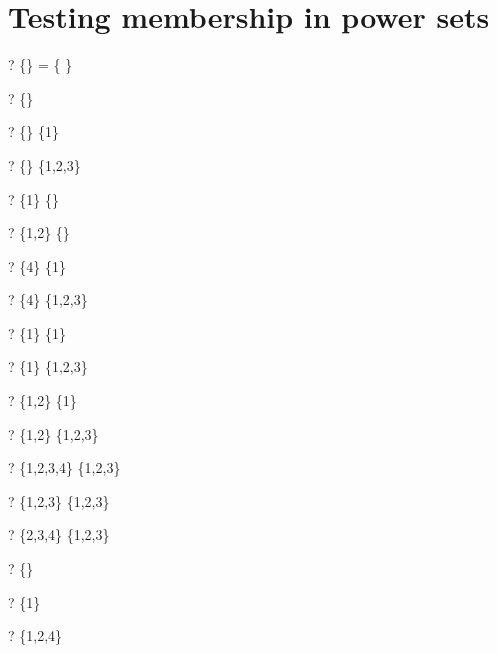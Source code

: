 \documentclass{article}
\begin{document}
\section{Testing membership in power sets}
\begin{zed} \vdash?  \power \{\} = \{ \emptyset[\nat] \} \end{zed}
\begin{zed} \vdash?  \emptyset[\power\nat] \in \power \{\} \end{zed}
\begin{zed} \vdash?  \{\} \in \power \{1\} \end{zed}
\begin{zed} \vdash?  \{\} \in \power \{1,2,3\} \end{zed}
\begin{zed} \vdash?  \{1\} \notin \power \{\} \end{zed}
\begin{zed} \vdash?  \{1,2\} \notin \power \{\} \end{zed}
\begin{zed} \vdash?  \{4\} \notin \power \{1\} \end{zed}
\begin{zed} \vdash?  \{4\} \notin \power \{1,2,3\} \end{zed}
\begin{zed} \vdash?  \{1\} \in \power \{1\} \end{zed}
\begin{zed} \vdash?  \{1\} \in \power \{1,2,3\} \end{zed}
\begin{zed} \vdash?  \{1,2\} \notin \power \{1\} \end{zed}
\begin{zed} \vdash?  \{1,2\} \in \power \{1,2,3\} \end{zed}
\begin{zed} \vdash?  \{1,2,3,4\} \notin \power \{1,2,3\} \end{zed}
\begin{zed} \vdash?  \{1,2,3\} \in \power \{1,2,3\} \end{zed}
\begin{zed} \vdash?  \{2,3,4\} \notin \power \{1,2,3\} \end{zed}
\begin{zed} \vdash?  \{\} \in \power \nat \end{zed}
\begin{zed} \vdash?  \{1\} \in \power \nat \end{zed}
\begin{zed} \vdash?  \{1,2,4\} \in \power \nat \end{zed}
\end{document}
